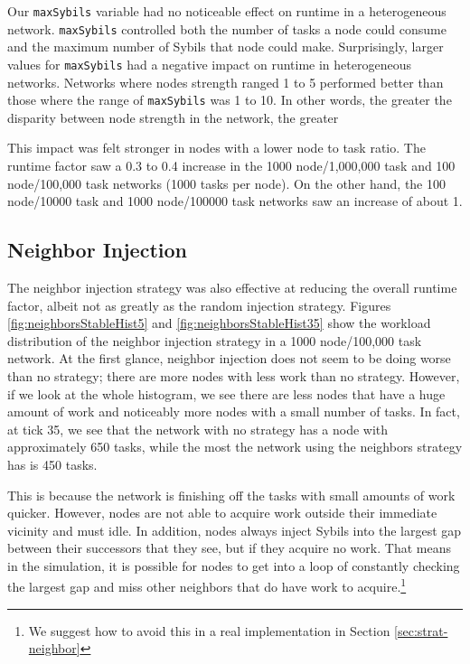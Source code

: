 Our \texttt{maxSybils} variable had no noticeable effect on runtime in a heterogeneous network.
\texttt{maxSybils} controlled both the number of tasks a node could consume and the maximum number of Sybils that node could make.
Surprisingly, larger values for \texttt{maxSybils} had a negative impact on runtime in heterogeneous networks.
Networks where nodes strength ranged 1 to 5 performed better than those where the range of \texttt{maxSybils} was 1 to 10.
In other words, the greater the disparity between node strength in the network, the greater 

This impact was felt stronger in nodes with a lower node to task ratio.
The runtime factor saw  a 0.3 to 0.4 increase in the 1000 node/1,000,000 task and 100 node/100,000 task networks (1000 tasks per node).
On the other hand, the 100 node/10000 task  and 1000 node/100000 task networks saw an increase of about 1.



\subsection{Neighbor Injection}
The neighbor injection strategy was also effective at reducing the overall runtime factor, albeit not as greatly as the random injection strategy.
Figures \ref{fig:neighborsStableHist5} and \ref{fig:neighborsStableHist35} show the workload distribution of the neighbor injection strategy in a 1000 node/100,000 task network.
At the first glance, neighbor injection does not seem to be doing worse than no strategy; there are more nodes with less work than no strategy.
However, if we look at the whole histogram, we see there are less nodes that have a huge amount of work and noticeably more nodes with a small number of tasks.
In fact, at tick 35, we see that the network with no strategy has a node with approximately 650 tasks, while the most the network using the neighbors strategy has is 450 tasks.

This is because the network is finishing off the tasks with small amounts of work quicker.
However, nodes are not able to acquire work outside their immediate vicinity and must idle.
In addition, nodes always inject Sybils into the largest gap between their successors that they see, but if they acquire no work.
That means in the simulation, it is possible for nodes to get into a loop of constantly checking the largest gap and miss other neighbors that do have work to acquire.\footnote{We suggest how to avoid this in a real implementation in Section \ref{sec:strat-neighbor}}

